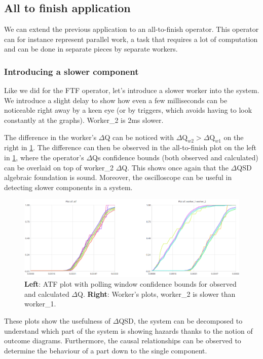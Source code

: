 \subsection{All to finish application}
    We can extend the previous application to an all-to-finish operator. This operator can for instance represent parallel work, a task that requires a lot of computation and can be done in separate pieces by separate workers. \cite{dq-tut}

        \subsubsection{Introducing a slower component}
            Like we did for the FTF operator, let's introduce a slower worker into the system. We introduce a slight delay to show how even a few milliseconds can be noticeable right away by a keen eye (or by triggers, which avoids having to look constantly at the graphs). Worker\_2 is 2ms slower.
 
            The difference in the worker's $\Delta$Q can be noticed with $\Delta \text{Q}_{w2} > \Delta \text{Q}_{w1}$ on the right in \cref{fig:slower_atf}. The difference can then be observed in the all-to-finish plot on the left in \cref{fig:slower_atf}, where the operator's $\Delta$Qs confidence bounds (both observed and calculated) can be overlaid on top of worker\_2 $\Delta$Q. This shows once again that the $\Delta$QSD algebraic foundation is sound. Moreover, the oscilloscope can be useful in detecting slower components in a system.

            \begin{figure}[H]
                \begin{center}
                    \includegraphics[scale = 0.5]{img/overload_2/w1w2atf.png}
                \end{center}
                \caption{\textbf{Left}: ATF plot with polling window confidence bounds for observed and calculated $\Delta$Q. \textbf{Right}: Worker's plots, worker\_2 is slower than worker\_1.}
                \label{fig:slower_atf}
            \end{figure}

    These plots show the usefulness of $\Delta$QSD, the system can be decomposed to understand which part of the system is showing hazards thanks to the notion of outcome diagrams. Furthermore, the causal relationships can be observed to determine the behaviour of a part down to the single component.
